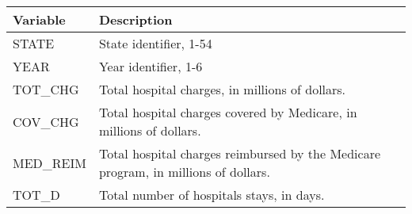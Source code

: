\documentclass[]{book}
\begin{document}
\begin{longtable}[]{@{}ll@{}}
\toprule
\begin{minipage}[b]{0.09\columnwidth}\raggedright
Variable\strut
\end{minipage} & \begin{minipage}[b]{0.85\columnwidth}\raggedright
Description\strut
\end{minipage}\tabularnewline
\midrule
\endhead
\begin{minipage}[t]{0.09\columnwidth}\raggedright
STATE\strut
\end{minipage} & \begin{minipage}[t]{0.85\columnwidth}\raggedright
State identifier, 1-54\strut
\end{minipage}\tabularnewline
\begin{minipage}[t]{0.09\columnwidth}\raggedright
YEAR\strut
\end{minipage} & \begin{minipage}[t]{0.85\columnwidth}\raggedright
Year identifier, 1-6\strut
\end{minipage}\tabularnewline
\begin{minipage}[t]{0.09\columnwidth}\raggedright
TOT\_CHG\strut
\end{minipage} & \begin{minipage}[t]{0.85\columnwidth}\raggedright
Total hospital charges, in millions of dollars.\strut
\end{minipage}\tabularnewline
\begin{minipage}[t]{0.09\columnwidth}\raggedright
COV\_CHG\strut
\end{minipage} & \begin{minipage}[t]{0.85\columnwidth}\raggedright
Total hospital charges covered by Medicare, in millions of dollars.\strut
\end{minipage}\tabularnewline
\begin{minipage}[t]{0.09\columnwidth}\raggedright
MED\_REIM\strut
\end{minipage} & \begin{minipage}[t]{0.85\columnwidth}\raggedright
Total hospital charges reimbursed by the Medicare program, in millions of dollars.\strut
\end{minipage}\tabularnewline
\begin{minipage}[t]{0.09\columnwidth}\raggedright
TOT\_D\strut
\end{minipage} & \begin{minipage}[t]{0.85\columnwidth}\raggedright
Total number of hospitals stays, in days.\strut

\end{minipage}
\end{longtable}
\end{document}
